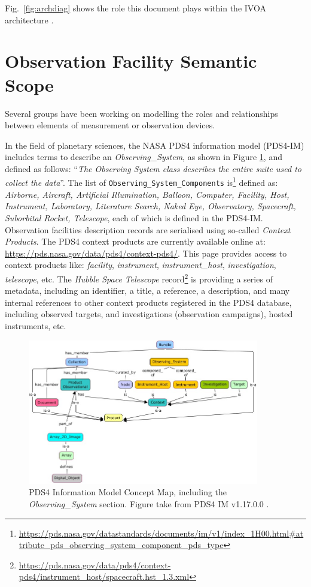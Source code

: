 \documentclass[11pt,a4paper]{ivoa}
\begin{document}
Fig.~\ref{fig:archdiag} shows the role this document plays within the
IVOA architecture \citep{2010ivoa.rept.1123A}.

\section{Observation Facility Semantic Scope}
\label{sec:scope}

Several groups have been working on modelling the roles and 
relationships between elements of measurement or observation devices. 

In the field of planetary sciences, the NASA PDS4 information model 
(PDS4-IM) includes terms to describe an \emph{Observing\_System}, as 
shown in Figure \ref{fig:pds4-concept-map}, and defined as follows:
``\emph{The Observing System class describes the entire suite used to 
collect the data}''. The list of \texttt{Observing\_System\_Components} 
is\footnote{\url{https://pds.nasa.gov/datastandards/documents/im/v1/index_1H00.html\#attribute_pds_observing_system_component_pds_type}}
defined as: \emph{Airborne, Aircraft, Artificial Illumination, 
Balloon, Computer, Facility, Host, Instrument, Laboratory, Literature 
Search, Naked Eye, Observatory, Spacecraft, Suborbital Rocket, 
Telescope}, each of which is defined in the PDS4-IM. Observation 
facilities description records are serialised using so-called 
\emph{Context Products}. The PDS4 context products are currently available 
online at: \url{https://pds.nasa.gov/data/pds4/context-pds4/}. This 
page provides access to  context products like: \emph{facility}, 
\emph{instrument}, \emph{instrument\_host}, \emph{investigation}, 
\emph{telescope}, etc. The \emph{Hubble Space Telescope} 
record\footnote{\protect\url{https://pds.nasa.gov/data/pds4/context-pds4/instrument_host/spacecraft.hst_1.3.xml}} 
is providing a series of metadata, including an identifier, a title, 
a reference, a description, and many internal references to other 
context products registered in the PDS4 database, including 
observed targets, and investigations (observation campaigns), hosted 
instruments, etc.

\begin{figure}
\centering\includegraphics[width=0.9\textwidth]{pds4-concept-map.jpg}
\caption{PDS4 Information Model Concept Map, including the 
\emph{Observing\_System} section. Figure take from PDS4 IM v1.17.0.0 
\protect\citep{pds4-im-v1H00}.}\label{fig:pds4-concept-map}
\end{figure}
\end{document}
